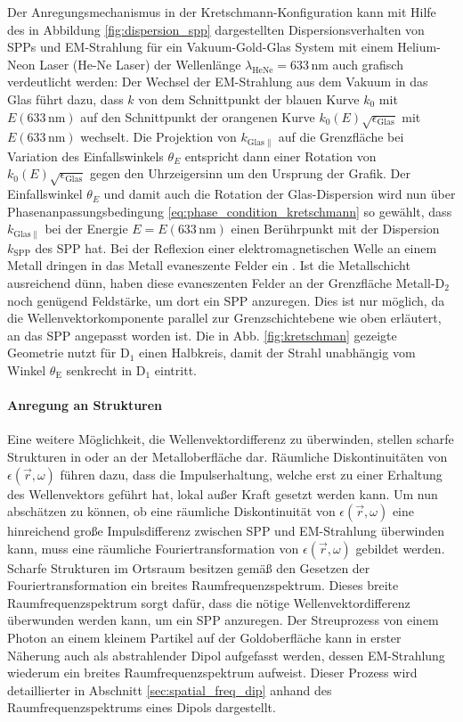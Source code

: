 \documentclass[titlepage,  ngerman]{article}
\begin{document}
	Der Anregungsmechanismus in der Kretschmann-Konfiguration kann mit Hilfe des in Abbildung \ref{fig:dispersion_spp} dargestellten Dispersionsverhalten von SPPs und EM-Strahlung für ein Vakuum-Gold-Glas System mit einem Helium-Neon Laser (He-Ne Laser) der Wellenlänge $\lambda_{\mathrm{HeNe}}=633\,\mathrm{nm}$ auch grafisch verdeutlicht werden: Der Wechsel der EM-Strahlung aus dem Vakuum in das Glas führt dazu, dass $k$ von dem Schnittpunkt der blauen Kurve $k_0$ mit $E(633 \, \mathrm{nm})$ auf den Schnittpunkt der orangenen Kurve $k_0(E)\sqrt{\epsilon_\mathrm{Glas}}$ mit $E(633 \, \mathrm{nm})$ wechselt. Die Projektion von $k_{\mathrm{Glas}\parallel}$ auf die Grenzfläche bei Variation des Einfallswinkels $\theta_E$ entspricht dann einer Rotation von $k_0(E)\sqrt{\epsilon_\mathrm{Glas}}$ gegen den Uhrzeigersinn um den Ursprung der Grafik. Der Einfallswinkel  $\theta_E$ und damit auch die Rotation der Glas-Dispersion wird nun über Phasenanpassungsbedingung \eqref{eq:phase_condition_kretschmann} so gewählt, dass $k_{\mathrm{Glas}\parallel}$ bei der Energie $E=E(633\,\mathrm{nm})$ einen Berührpunkt mit der Dispersion $k_\mathrm{SPP}$ des SPP hat.
	Bei der Reflexion einer elektromagnetischen Welle an einem Metall dringen in das Metall evaneszente Felder ein \cite{Novotny.2012b}. Ist die Metallschicht ausreichend dünn, haben diese evaneszenten Felder an der Grenzfläche Metall-$\mathrm{D}_2$ noch genügend Feldstärke, um dort ein SPP anzuregen. Dies ist nur möglich, da die Wellenvektorkomponente parallel zur Grenzschichtebene wie oben erläutert, an das SPP angepasst worden ist. Die in Abb. \ref{fig:kretschman} gezeigte Geometrie nutzt für $\mathrm{D}_1$ einen Halbkreis, damit der Strahl unabhängig vom Winkel $\theta_\mathrm{E}$ senkrecht in $\mathrm{D}_1$ eintritt. \cite{Kretschmann.1971	}
	\paragraph{Anregung an Strukturen}
	Eine weitere Möglichkeit, die Wellenvektordifferenz zu überwinden, stellen scharfe Strukturen in oder an der Metalloberfläche dar. Räumliche Diskontinuitäten von $\epsilon(\vec{r},\omega)$ führen dazu, dass die Impulserhaltung, welche erst zu einer Erhaltung des Wellenvektors geführt hat, lokal außer Kraft gesetzt werden kann. Um nun abschätzen zu können, ob eine räumliche Diskontinuität von $\epsilon(\vec{r},\omega)$ eine hinreichend große Impulsdifferenz zwischen SPP und EM-Strahlung überwinden kann, muss eine räumliche Fouriertransformation von $\epsilon(\vec{r},\omega)$ gebildet werden. Scharfe Strukturen im Ortsraum besitzen gemäß den Gesetzen der Fouriertransformation ein breites Raumfrequenzspektrum. Dieses breite Raumfrequenzspektrum sorgt dafür, dass die nötige Wellenvektordifferenz überwunden werden kann, um ein SPP anzuregen. Der Streuprozess von einem Photon an einem kleinem Partikel auf der Goldoberfläche kann in erster Näherung auch als abstrahlender Dipol aufgefasst werden, dessen EM-Strahlung wiederum ein breites Raumfrequenzspektrum aufweist. Dieser Prozess wird detaillierter in Abschnitt \ref{sec:spatial_freq_dip} anhand des Raumfrequenzspektrums eines Dipols dargestellt. \cite{Maier.2007}
\end{document}
